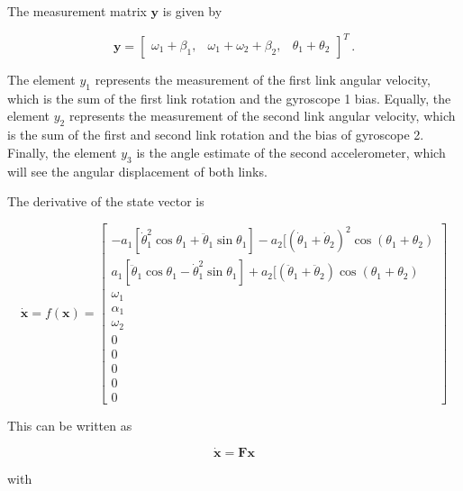 The measurement matrix $\mathbf{y}$ is given by

\begin{equation} \label{eq:measurement_vector}
  \mathbf{y} = \begin{bmatrix}
  	\omega_1 + \beta_1, & \omega_1 + \omega_2 + \beta_2, & \theta_1 + \theta_2
  \end{bmatrix}^T\,.
\end{equation}
 
\noindent
The element $y_1$ represents the measurement of the first link angular velocity, which is the sum of the first link rotation and the gyroscope 1 bias. Equally, the element $y_2$ represents the measurement of the second link angular velocity, which is the sum of the first and second link rotation and the bias of gyroscope 2. Finally, the element $y_3$ is the angle estimate of the second accelerometer, which will see the angular displacement of both links.

The derivative of the state vector is

\begin{equation} \label{eq:state_vector_derivative}
  \dot{\mathbf{x}} = f(\mathbf{x}) = \left[\begin{smallmatrix}
  -a_1 [\dot{\theta}^2_1 \cos \theta_1 + \ddot{\theta}_1 \sin \theta_1] - a_2 [(\dot{\theta}_1 + \dot{\theta}_2)^2 \cos(\theta_1 + \theta_2) \\
  a_1 [\ddot{\theta}_1 \cos \theta_1 - \dot{\theta}^2_1 \sin \theta_1] + a_2 [(\ddot{\theta}_1 + \ddot{\theta}_2) \cos(\theta_1 + \theta_2) \\ \omega_1 \\ \alpha_1 \\ \omega_2 \\ 0 \\ 0 \\ 0 \\ 0 \\ 0
  \end{smallmatrix}\right]
\end{equation}

\noindent
This can be written as

\begin{equation}
  \dot{\mathbf{x}} = \mathbf{F} \mathbf{x}
\end{equation}

\noindent
with

